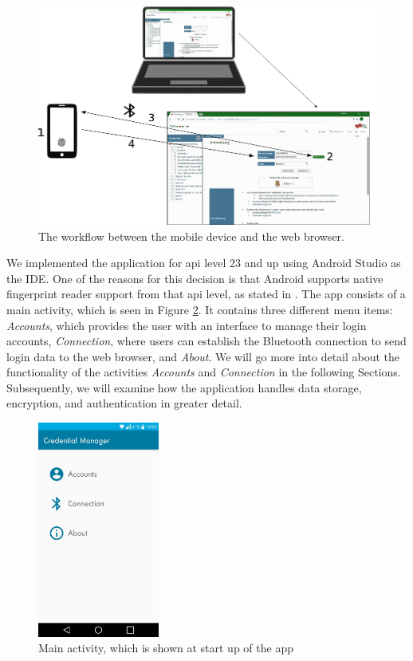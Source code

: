\vspace{0.3cm}
\begin{figure}[!htb]
    \centering
    \includegraphics[width=14cm]{images/Communication.png}
    \caption[Workflow between Devices]{The workflow between the mobile device and the web browser.}
    \label{fig:comm}
\end{figure}
\vspace{0.3cm}



\noindent We implemented the application for \gls{api} level 23 and up using Android Studio as the IDE. One of the reasons for this decision is that Android supports native fingerprint reader support from that \gls{api} level, as stated in \cite{AndroidM}. The app consists of a main activity, which is seen in Figure \ref{fig:mainactivity}. It contains three different menu items: \textit{Accounts}, which provides the user with an interface to manage their login accounts, \textit{Connection}, where users can establish the Bluetooth connection to send login data to the web browser, and \textit{About}. We will go more into detail about the functionality of the activities \textit{Accounts} and \textit{Connection} in the following Sections. Subsequently, we will examine how the application handles data storage, encryption, and authentication in greater detail.

\begin{figure}[!htb]
\centering
\includegraphics[width=4cm]{images/MainActivityNew}
\caption[Main Activity]{Main activity, which is shown at start up of the app}
\label{fig:mainactivity}
\end{figure}

